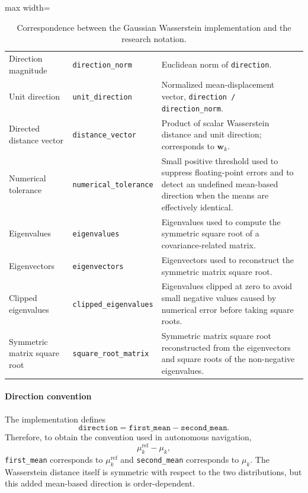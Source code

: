 \documentclass[a4paper]{article}
\begin{document}
\begin{table}[H]
\begin{adjustbox}{max width=\textwidth}
\begin{tabular}{p{} p{} p{}}
         Direction magnitude
         & \texttt{direction\_norm}
         & Euclidean norm of \texttt{direction}. \\

         Unit direction
         & \texttt{unit\_direction}
         & Normalized mean-displacement vector, \texttt{direction / direction\_norm}. \\

         Directed distance vector
         & \texttt{distance\_vector}
         & Product of scalar Wasserstein distance and unit direction; corresponds to $\mathbf{w}_k$. \\

         Numerical tolerance
         & \texttt{numerical\_tolerance}
         & Small positive threshold used to suppress floating-point errors and to detect an undefined mean-based direction when the means are effectively identical. \\

         Eigenvalues
         & \texttt{eigenvalues}
         & Eigenvalues used to compute the symmetric square root of a covariance-related matrix. \\

         Eigenvectors
         & \texttt{eigenvectors}
         & Eigenvectors used to reconstruct the symmetric matrix square root. \\

         Clipped eigenvalues
         & \texttt{clipped\_eigenvalues}
         & Eigenvalues clipped at zero to avoid small negative values caused by numerical error before taking square roots. \\

         Symmetric matrix square root
         & \texttt{square\_root\_matrix}
         & Symmetric matrix square root reconstructed from the eigenvectors and square roots of the non-negative eigenvalues. \\

         \hline
      \end{tabular}
      \end{adjustbox}

      \caption{Correspondence between the Gaussian Wasserstein implementation and the research notation.}
      \label{tab:directed-gaussian-wasserstein-implementation-variables}
   \end{table}

   \paragraph{Direction convention}
   The implementation defines
   \[
      \texttt{direction}
      =
      \texttt{first\_mean}
      -
      \texttt{second\_mean}.
   \]
   Therefore, to obtain the convention used in autonomous navigation,
   \[
      \mu_k^{\mathrm{ref}}-\mu_k,
   \]
   \texttt{first\_mean} corresponds to $\mu_k^{\mathrm{ref}}$ and \texttt{second\_mean} corresponds to $\mu_k$. The Wasserstein distance itself is symmetric with respect to the two distributions, but this added mean-based direction is order-dependent.
\end{document}
